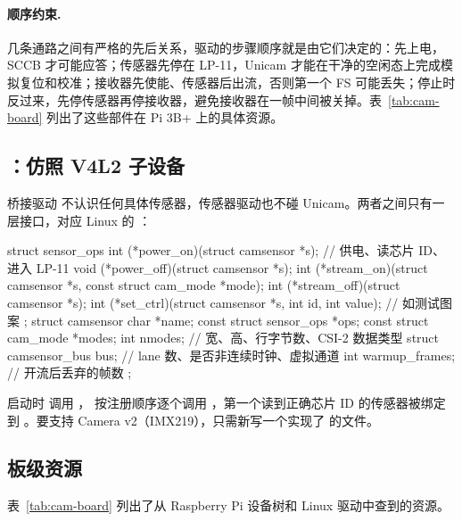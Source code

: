 \paragraph{顺序约束.} 几条通路之间有严格的先后关系，驱动的步骤顺序就是由它们决定的：先上电，SCCB 才可能应答；传感器先停在 LP-11，Unicam 才能在干净的空闲态上完成模拟复位和校准；接收器先使能、传感器后出流，否则第一个 FS 可能丢失；停止时反过来，先停传感器再停接收器，避免接收器在一帧中间被关掉。表~\ref{tab:cam-board} 列出了这些部件在 Pi 3B+ 上的具体资源。


\subsection{：仿照 V4L2 子设备}

桥接驱动  不认识任何具体传感器，传感器驱动也不碰 Unicam。两者之间只有一层接口，对应 Linux 的 ：

\begin{ccode}
struct sensor_ops {
  int  (*power_on)(struct camsensor *s);             // 供电、读芯片 ID、进入 LP-11
  void (*power_off)(struct camsensor *s);
  int  (*stream_on)(struct camsensor *s, const struct cam_mode *mode);
  int  (*stream_off)(struct camsensor *s);
  int  (*set_ctrl)(struct camsensor *s, int id, int value);   // 如测试图案
};
struct camsensor {
  char *name;  const struct sensor_ops *ops;
  const struct cam_mode *modes;  int nmodes;          // 宽、高、行字节数、CSI-2 数据类型
  struct camsensor_bus bus;                           // lane 数、是否非连续时钟、虚拟通道
  int warmup_frames;                                  // 开流后丢弃的帧数
};
\end{ccode}

启动时  调用 ， 按注册顺序逐个调用 ，第一个读到正确芯片 ID 的传感器被绑定到 。要支持 Camera v2（IMX219），只需新写一个实现了  的文件。

\subsection{板级资源}

表~\ref{tab:cam-board} 列出了从 Raspberry Pi 设备树和 Linux 驱动中查到的资源。

